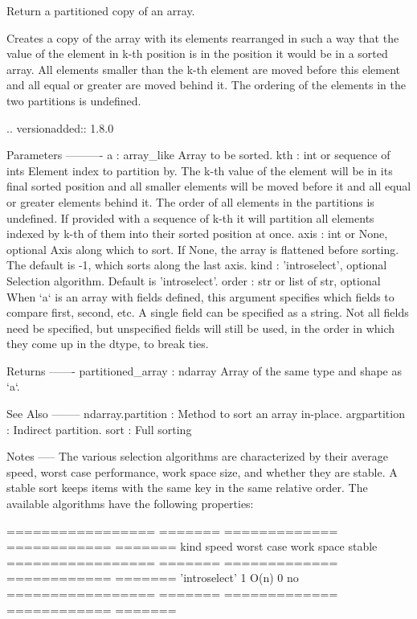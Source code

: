 \begin{DoxyVerb}Return a partitioned copy of an array.

Creates a copy of the array with its elements rearranged in such a
way that the value of the element in k-th position is in the
position it would be in a sorted array. All elements smaller than
the k-th element are moved before this element and all equal or
greater are moved behind it. The ordering of the elements in the two
partitions is undefined.

.. versionadded:: 1.8.0

Parameters
----------
a : array_like
    Array to be sorted.
kth : int or sequence of ints
    Element index to partition by. The k-th value of the element
    will be in its final sorted position and all smaller elements
    will be moved before it and all equal or greater elements behind
    it. The order of all elements in the partitions is undefined. If
    provided with a sequence of k-th it will partition all elements
    indexed by k-th  of them into their sorted position at once.
axis : int or None, optional
    Axis along which to sort. If None, the array is flattened before
    sorting. The default is -1, which sorts along the last axis.
kind : {'introselect'}, optional
    Selection algorithm. Default is 'introselect'.
order : str or list of str, optional
    When `a` is an array with fields defined, this argument
    specifies which fields to compare first, second, etc.  A single
    field can be specified as a string.  Not all fields need be
    specified, but unspecified fields will still be used, in the
    order in which they come up in the dtype, to break ties.

Returns
-------
partitioned_array : ndarray
    Array of the same type and shape as `a`.

See Also
--------
ndarray.partition : Method to sort an array in-place.
argpartition : Indirect partition.
sort : Full sorting

Notes
-----
The various selection algorithms are characterized by their average
speed, worst case performance, work space size, and whether they are
stable. A stable sort keeps items with the same key in the same
relative order. The available algorithms have the following
properties:

================= ======= ============= ============ =======
   kind            speed   worst case    work space  stable
================= ======= ============= ============ =======
'introselect'        1        O(n)           0         no
================= ======= ============= ============ =======


\end{DoxyVerb}
